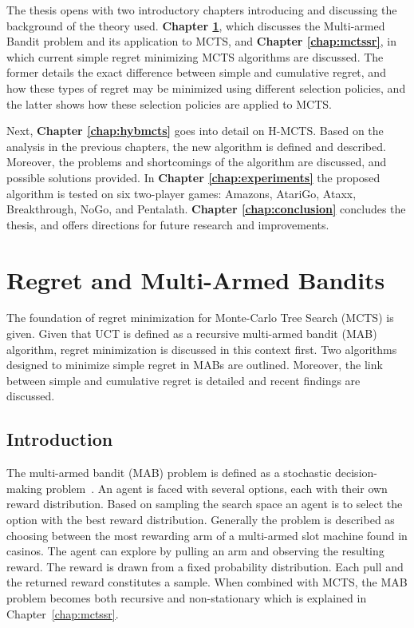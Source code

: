 \documentclass{kecsmstr}
\begin{document}
The thesis opens with two introductory chapters introducing and discussing the background of the theory used. \textbf{Chapter \ref{chap:mab}}, which discusses the Multi-armed Bandit problem and its application to MCTS, and \textbf{Chapter \ref{chap:mctssr}}, in which current simple regret minimizing MCTS algorithms are discussed. The former details the exact difference between simple and cumulative regret, and how these types of regret may be minimized using different selection policies, and the latter shows how these selection policies are applied to MCTS.

Next, \textbf{Chapter \ref{chap:hybmcts}} goes into detail on H-MCTS. Based on the analysis in the previous chapters, the new algorithm is defined and described. Moreover, the problems and shortcomings of the algorithm are discussed, and possible solutions provided. In \textbf{Chapter \ref{chap:experiments}} the proposed algorithm is tested on six two-player games: Amazons, AtariGo, Ataxx, Breakthrough, NoGo, and Pentalath. \textbf{Chapter \ref{chap:conclusion}} concludes the thesis, and offers directions for future research and improvements.

\chapter{Regret and Multi-Armed Bandits}
\label{chap:mab}
\begin{chaptercontents} The foundation of regret minimization for Monte-Carlo Tree Search (MCTS) is given. Given that UCT is defined as a recursive multi-armed bandit (MAB) algorithm, regret minimization is discussed in this context first. Two algorithms designed to minimize simple regret in MABs are outlined. Moreover, the link between simple and cumulative regret is detailed and recent findings are discussed. 
\end{chaptercontents}

\section{Introduction}
The multi-armed bandit (MAB) problem is defined as a stochastic decision-making problem~. An agent is faced with several options, each with their own reward distribution. Based on sampling the search space an agent is to select the option with the best reward distribution. Generally the problem is described as choosing between the most rewarding arm of a multi-armed slot machine found in casinos. The agent can explore by pulling an arm and observing the resulting reward. The reward is drawn from a fixed probability distribution. Each pull and the returned reward constitutes a sample. When combined with MCTS, the MAB problem becomes both recursive and non-stationary which is explained in Chapter~\ref{chap:mctssr}.
\end{document}

